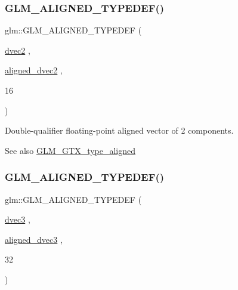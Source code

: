 \subsubsection{\texorpdfstring{G\+L\+M\+\_\+\+A\+L\+I\+G\+N\+E\+D\+\_\+\+T\+Y\+P\+E\+D\+E\+F()}{GLM\_ALIGNED\_TYPEDEF()}\hspace{0.1cm}{\footnotesize\ttfamily [156/209]}}
{\footnotesize\ttfamily glm\+::\+G\+L\+M\+\_\+\+A\+L\+I\+G\+N\+E\+D\+\_\+\+T\+Y\+P\+E\+D\+EF (\begin{DoxyParamCaption}\item[{\mbox{\hyperlink{group__core__types_gae6727259898288cae197724d5f172b3b}{dvec2}}}]{,  }\item[{\mbox{\hyperlink{group__gtc__type__aligned_ga1e6972e837bc34b3424af8d63a71d7c6}{aligned\+\_\+dvec2}}}]{,  }\item[{16}]{ }\end{DoxyParamCaption})}

Double-\/qualifier floating-\/point aligned vector of 2 components. \begin{DoxySeeAlso}{See also}
\mbox{\hyperlink{group__gtx__type__aligned}{G\+L\+M\+\_\+\+G\+T\+X\+\_\+type\+\_\+aligned}} 
\end{DoxySeeAlso}
\mbox{\label{group__gtx__type__aligned_ga01fe6fee6db5df580b6724a7e681f069}} 
\subsubsection{\texorpdfstring{G\+L\+M\+\_\+\+A\+L\+I\+G\+N\+E\+D\+\_\+\+T\+Y\+P\+E\+D\+E\+F()}{GLM\_ALIGNED\_TYPEDEF()}\hspace{0.1cm}{\footnotesize\ttfamily [157/209]}}
{\footnotesize\ttfamily glm\+::\+G\+L\+M\+\_\+\+A\+L\+I\+G\+N\+E\+D\+\_\+\+T\+Y\+P\+E\+D\+EF (\begin{DoxyParamCaption}\item[{\mbox{\hyperlink{group__core__types_ga7f3287f952e6ccb481231368091702ac}{dvec3}}}]{,  }\item[{\mbox{\hyperlink{group__gtc__type__aligned_ga82da11893fbac3bda647c9de9da62693}{aligned\+\_\+dvec3}}}]{,  }\item[{32}]{ }\end{DoxyParamCaption})}

